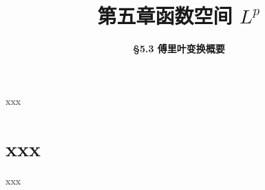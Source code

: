 


\title[第五章\\
函数空间Lp]{\texorpdfstring{\LARGE \bfseries 第五章\quad 函数空间 $L^p$}{第五章 函数空间Lp}} %
\author[\S 5.3\\
傅里叶变换] %
{\Large \bfseries \S 5.3 傅里叶变换概要}
\date{}





\begin{frame}

\titlepage %

\end{frame}





\begin{frame}{xxx}



\end{frame}


\section{xxx}


\begin{frame}{xxx}


\end{frame}



